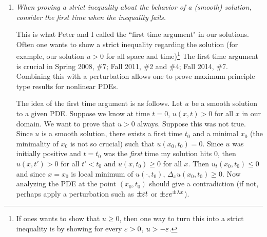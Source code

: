 \begin{enumerate}[$(1)$]
\begin{proof}
yields that $\liminf_{p \rightarrow \infty}\nm{f}_{L^{p}} \geq \nm{f}_{L^{\infty}}$. Thus we have $\lim_{p \rightarrow \infty}\nm{f}_{L^{p}} = \nm{f}_{L^{\infty}}$.
\end{proof}
Thus if we know smoothing about $\nms{u}_{L^{p}_{x}(\Om)} \leq M$ for some $M$ (where $M$ can depend on $p$ and $t$), then
by the above lemma,
\ba
\sup_{x \in \Om} = _{L^{\infty}_{x}(\Om)} = \lim_{p\rightarrow \infty}_{L^{p}_{x}(\Om)} \leq M.
\ea
This approach can look slightly more complicated (for example, usually one works with $E(t) := \int_{\Om}|u|^{p}\, dx$ which is $\nms{u}_{L^{p}_{x}(\Om)}^{p}$
and then take the time derivative), but it reduces the problem to just straightforward computation and does not require any clever observations or substitutions
to find a maximum principle for the problem.

\item \emph{When proving a strict inequality about the behavior of a (smooth) solution, consider the first time when the inequality fails.}

This is what Peter and I called the ``first time argument" in our solutions. Often one wants to show a strict inequality regarding the solution (for example,
our solution $u > 0$ for all space and time)\footnote{If ones wants to show that $u \geq 0$, then one way to turn this into a strict inequality is by showing for every $\varepsilon > 0$,
$u > -\varepsilon$.} The first time argument is crucial in Spring 2008, \#7; Fall 2011, \#2 and \#4; Fall 2014, \#7. Combining this with a perturbation
allows one to prove maximum principle type results for nonlinear PDEs.

The idea of the first time argument is as follows. Let $u$ be a smooth solution to a given PDE. Suppose we know at time $t = 0$, $u(x, t) > 0$ for all $x$ in our domain.
We want to prove that $u > 0$ always. Suppose this was not true. Since $u$ is a smooth solution, there exists a first time $t_{0}$ and a minimal $x_{0}$ (the minimality of $x_{0}$
is not so crucial) such that $u(x_{0}, t_{0}) = 0$. Since $u$ was initially positive and $t = t_{0}$ was the \emph{first} time my solution hits 0,
then $u(x, t') > 0$ for all $t' < t_{0}$ and $u(x, t_{0}) \geq 0$ for all $x$. Then $u_{t}(x_{0}, t_{0}) \leq 0$ and since $x = x_{0}$ is local minimum of $u(\cdot, t_{0})$,
$\Delta_{x}u(x_{0}, t_{0}) \geq 0$. Now analyzing the PDE at the point $(x_{0}, t_{0})$ should give a contradiction (if not, perhaps apply a perturbation such as $\pm \varepsilon t$ or $\pm \varepsilon e^{\pm \lambda x}$).
\end{enumerate}

